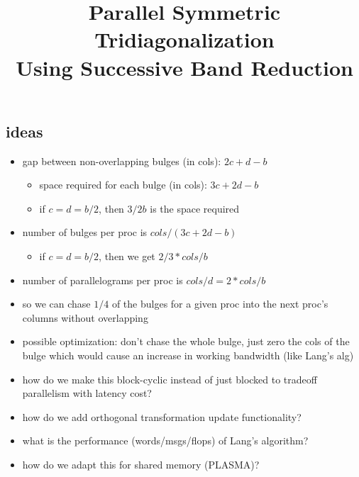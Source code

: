 \documentclass[10pt]{article}
\begin{document}
\title{Parallel Symmetric Tridiagonalization \\ Using Successive Band Reduction}

\maketitle

\subsection{ideas}

\begin{itemize}
	\item gap between non-overlapping bulges (in cols): $2c+d-b$
	\begin{itemize}
		\item space required for each bulge (in cols): $3c+2d-b$
		\item if $c=d=b/2$, then $3/2 b$ is the space required
	\end{itemize}

	\item number of bulges per proc is $cols / (3c+2d-b)$
	\begin{itemize}
		\item if $c=d=b/2$, then we get $2/3 * cols / b$
	\end{itemize}

	\item number of parallelograms per proc is $cols / d = 2 * cols / b$

	\item so we can chase $1/4$ of the bulges for a given proc into the next proc's columns without overlapping

	\item possible optimization: don't chase the whole bulge, just zero the cols of the bulge which would cause an increase in working bandwidth (like Lang's alg)
	
	\item how do we make this block-cyclic instead of just blocked to tradeoff parallelism with latency cost?
	
	\item how do we add orthogonal transformation update functionality?
	
	\item what is the performance (words/msgs/flops) of Lang's algorithm?
	
	\item how do we adapt this for shared memory (PLASMA)?
	
\end{itemize}
\end{document}
